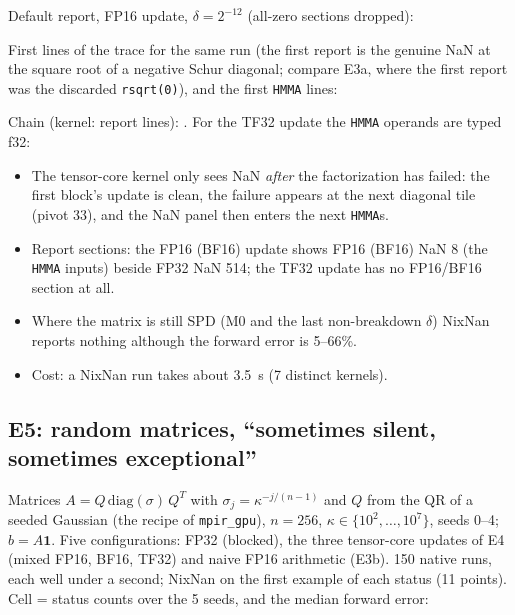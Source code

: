 \documentclass[11pt,a4paper]{article}
\begin{document}
\begin{center}\scriptsize\end{center}

Default report, FP16 update, $\delta=2^{-12}$ (all-zero sections dropped):



First lines of the trace for the same run (the first report is the genuine NaN at the square root of a negative Schur diagonal; compare E3a, where the first report was the discarded \texttt{rsqrt(0)}), and the first \texttt{HMMA} lines:




Chain (kernel: report lines): . For the TF32 update the \texttt{HMMA} operands are typed f32:



\begin{itemize}
  \item The tensor-core kernel only sees NaN \emph{after} the factorization has failed: the first block's update is clean, the failure appears at the next diagonal tile (pivot 33), and the NaN panel then enters the next \texttt{HMMA}s.
  \item Report sections: the FP16 (BF16) update shows FP16 (BF16) NaN 8 (the \texttt{HMMA} inputs) beside FP32 NaN 514; the TF32 update has no FP16/BF16 section at all.
  \item Where the matrix is still SPD (M0 and the last non-breakdown $\delta$) NixNan reports nothing although the forward error is 5--66\%.
  \item Cost: a NixNan run takes about 3.5~s (7 distinct kernels).
\end{itemize}


\subsection{E5: random matrices, ``sometimes silent, sometimes exceptional''}\label{sec:e5}

Matrices $A=Q\,\mathrm{diag}(\sigma)\,Q^T$ with $\sigma_j=\kappa^{-j/(n-1)}$ and $Q$ from the QR of a seeded Gaussian (the recipe of \texttt{mpir\_gpu}), $n=256$, $\kappa\in\{10^{2},\ldots,10^{7}\}$, seeds 0--4; $b=A\mathbf{1}$.
Five configurations: FP32 (blocked), the three tensor-core updates of E4 (mixed FP16, BF16, TF32) and naive FP16 arithmetic (E3b). 150 native runs, each well under a second; NixNan on the first example of each status (11 points).
Cell = status counts over the 5 seeds, and the median forward error:
\end{document}
